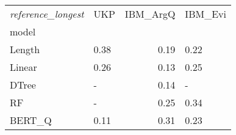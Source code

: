 \begin{tabular}{llrl}
\toprule
\textit{reference\_longest} &   UKP &  IBM\_ArgQ & IBM\_Evi \\
model  &       &           &         \\
\midrule
Length &  0.38 &      0.19 &    0.22 \\
Linear &  0.26 &      0.13 &    0.25 \\
DTree  &     - &      0.14 &       - \\
RF     &     - &      0.25 &    0.34 \\
BERT\_Q &  0.11 &      0.31 &    0.23 \\
\bottomrule
\end{tabular}
